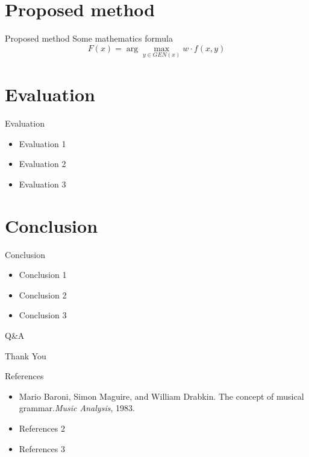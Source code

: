 \documentclass[11pt]{beamer}
\newcommand{\argmax}{\arg\!\max}
\begin{document}
\section{Proposed method}
\begin{frame}{Proposed method}
	Some mathematics formula $$F(x) = \argmax_{y \in GEN(x)} w \cdot f(x, y)$$
\end{frame}


\section{Evaluation}
\begin{frame}{Evaluation}
	\begin{itemize}
		\item Evaluation 1
		\item Evaluation 2
		\item Evaluation 3
	\end{itemize}
\end{frame}


\section{Conclusion}
\begin{frame}{Conclusion}
	\begin{itemize}
		\item Conclusion 1
		\item Conclusion 2
		\item Conclusion 3
	\end{itemize}
\end{frame}

\begin{frame}{Q\&A}
	\begin{center}
		\Huge Thank You
	\end{center}
\end{frame}

\begin{frame}{References}
	\begin{itemize}
		\item Mario Baroni, Simon Maguire, and William Drabkin. The concept of musical grammar.\textit{Music Analysis}, 1983.
		\item References 2
		\item References 3
	\end{itemize}
\end{frame}
\end{document}
